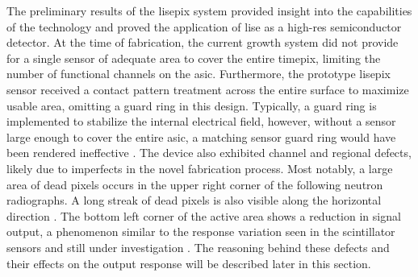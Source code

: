 \documentclass[../../../main.tex]{subfiles}%
\begin{document}
%
    \Xsubsection%
    The preliminary results of the \gls{lisepix} system provided insight into the capabilities of the technology and proved the application of \gls{lise} as a \gls{high-res} semiconductor detector.
    At the time of fabrication, the current growth system did not provide for a single sensor of adequate area to cover the entire \gls{timepix}, limiting the number of functional channels on the \gls{asic}.
    Furthermore, the prototype \gls{lisepix} sensor received a contact pattern treatment across the entire surface to maximize usable area, omitting a guard ring in this design.
    Typically, a guard ring is implemented to stabilize the internal electrical field, however, without a sensor large enough to cover the entire \gls{asic}, a matching sensor guard ring would have been rendered ineffective \cite{book:Rossi_2006}.
    The device also exhibited channel and regional defects, likely due to imperfects in the novel fabrication process.
    Most notably, a large area of dead pixels occurs in the upper right corner of the following neutron radiographs.
    A long streak of dead pixels is also visible along the horizontal direction \cite{Herrera_2018}.
    The bottom left corner of the active area shows a reduction in signal output, a phenomenon similar to the response variation seen in the scintillator sensors and still under investigation \cite{Lukosi_2016a}.
    The reasoning behind these defects and their effects on the output response will be described later in this section.
\end{document}
